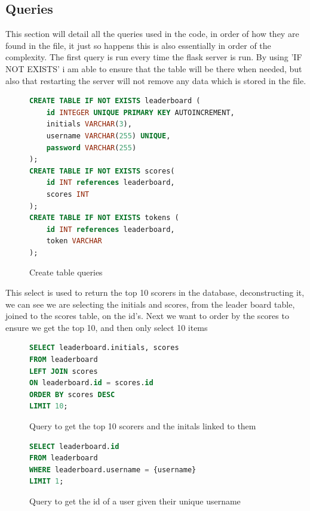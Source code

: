 \subsection{Queries}
This section will detail all the queries used in the code, in order of how they are found in the file, it just so happens this is also essentially in order of the complexity. The first query is run every time the flask server is run. By using 'IF NOT EXISTS' i am able to ensure that the table will be there when needed, but also that restarting the server will not remove any data which is stored in the file. 

\begin{figure}[H]
    \begin{lstlisting}[language=SQL, style=mystyle1]
CREATE TABLE IF NOT EXISTS leaderboard (
    id INTEGER UNIQUE PRIMARY KEY AUTOINCREMENT,
    initials VARCHAR(3),
    username VARCHAR(255) UNIQUE,
    password VARCHAR(255)
);
CREATE TABLE IF NOT EXISTS scores(
    id INT references leaderboard,
    scores INT
);
CREATE TABLE IF NOT EXISTS tokens (
    id INT references leaderboard,
    token VARCHAR
);
    \end{lstlisting}
      \centering
      \caption{Create table queries}
      \label{fig:SQL1}
\end{figure}

This select is used to return the top 10 scorers in the database, deconstructing it, we can see we are selecting the initials and scores, from the leader board table, joined to the scores table, on the id's. Next we want to order by the scores to ensure we get the top 10, and then only select 10 items
\begin{figure}[H]
    \begin{lstlisting}[language=SQL, style=mystyle1]
SELECT leaderboard.initials, scores
FROM leaderboard
LEFT JOIN scores
ON leaderboard.id = scores.id
ORDER BY scores DESC
LIMIT 10;
    \end{lstlisting}
      \centering
      \caption{Query to get the top 10 scorers and the initals linked to them}
      \label{fig:SQL2}
\end{figure}


\begin{figure}[H]
    \begin{lstlisting}[language=SQL, style=mystyle1]
SELECT leaderboard.id
FROM leaderboard
WHERE leaderboard.username = {username}
LIMIT 1;
    \end{lstlisting}
      \centering
      \caption{Query to get the id of a user given their unique username}
      \label{fig:SQL3}
\end{figure}


